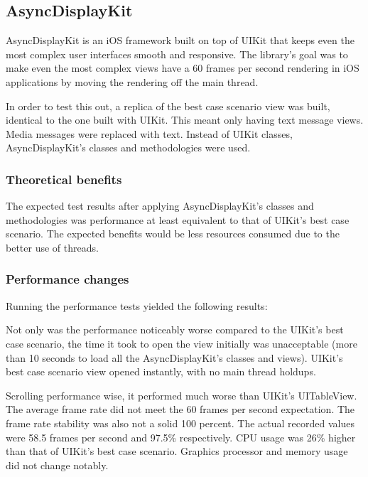 \documentclass[a4paper,12pt]{article}
\begin{document}
\subsection{AsyncDisplayKit}
AsyncDisplayKit is an iOS framework built on top of UIKit that keeps even the most complex user interfaces smooth and responsive.\cite{IntroducingAsyncDisplayKit} The library's goal was to make even the most complex views have a 60 frames per second rendering in iOS applications by moving the rendering off the main thread.

In order to test this out, a replica of the best case scenario view was built, identical to the one built with UIKit. This meant only having text message views. Media messages were replaced with text. Instead of UIKit classes, AsyncDisplayKit's classes and methodologies were used.

\subsubsection{Theoretical benefits}
The expected test results after applying AsyncDisplayKit's classes and methodologies was performance at least equivalent to that of UIKit's best case scenario. The expected benefits would be less resources consumed due to the better use of threads.

\subsubsection{Performance changes}
Running the performance tests yielded the following results:

Not only was the performance noticeably worse compared to the UIKit's best case scenario, the time it took to open the view initially was unacceptable (more than 10 seconds to load all the AsyncDisplayKit's classes and views). UIKit's best case scenario view opened instantly, with no main thread holdups.

Scrolling performance wise, it performed much worse than UIKit's UITableView. The average frame rate did not meet the 60 frames per second expectation. The frame rate stability was also not a solid 100 percent. The actual recorded values were 58.5 frames per second and 97.5\% respectively. CPU usage was 26\% higher than that of UIKit's best case scenario. Graphics processor and memory usage did not change notably.
\end{document}
